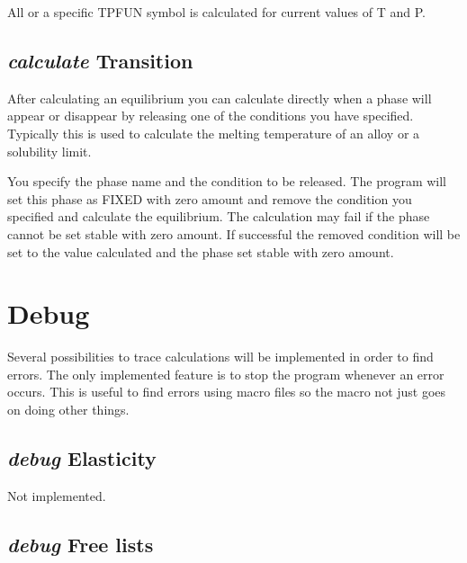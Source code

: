 \documentclass[12pt]{article}
\begin{document}
All or a specific TPFUN symbol is calculated for current values of T
and P.

\subsection{{\em calculate} Transition}

After calculating an equilibrium you can calculate directly when a
phase will appear or disappear by releasing one of the conditions you
have specified.  Typically this is used to calculate the melting
temperature of an alloy or a solubility limit.  

You specify the phase name and the condition to be released.  The
program will set this phase as FIXED with zero amount and remove the
condition you specified and calculate the equilibrium.  The
calculation may fail if the phase cannot be set stable with zero
amount.  If successful the removed condition will be set to the value
calculated and the phase set stable with zero amount.

\section{Debug }

Several possibilities to trace calculations will be implemented in
order to find errors.  The only implemented feature is to stop the
program whenever an error occurs.  This is useful to find errors using
macro files so the macro not just goes on doing other things.

\subsection{{\em debug} Elasticity}

Not implemented.

\subsection{{\em debug} Free lists}
\end{document}
